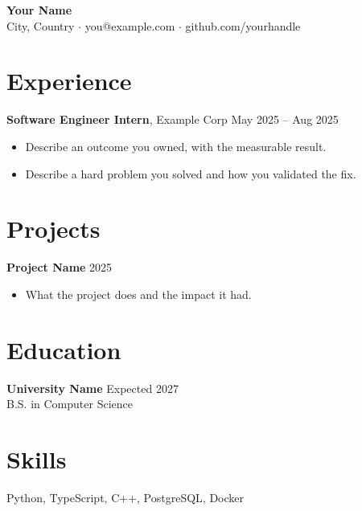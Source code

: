 \documentclass[letterpaper,11pt]{article}
\begin{document}
\begin{center}
  {\LARGE \textbf{Your Name}}\\[2pt]
  City, Country $\cdot$ you@example.com $\cdot$ github.com/yourhandle
\end{center}

\section{Experience}
\textbf{Software Engineer Intern}, Example Corp \hfill May 2025 -- Aug 2025
\begin{itemize}
  \item Describe an outcome you owned, with the measurable result.
  \item Describe a hard problem you solved and how you validated the fix.
\end{itemize}

\section{Projects}
\textbf{Project Name} \hfill 2025
\begin{itemize}
  \item What the project does and the impact it had.
\end{itemize}

\section{Education}
\textbf{University Name} \hfill Expected 2027\\
B.S. in Computer Science

\section{Skills}
Python, TypeScript, C++, PostgreSQL, Docker
\end{document}
